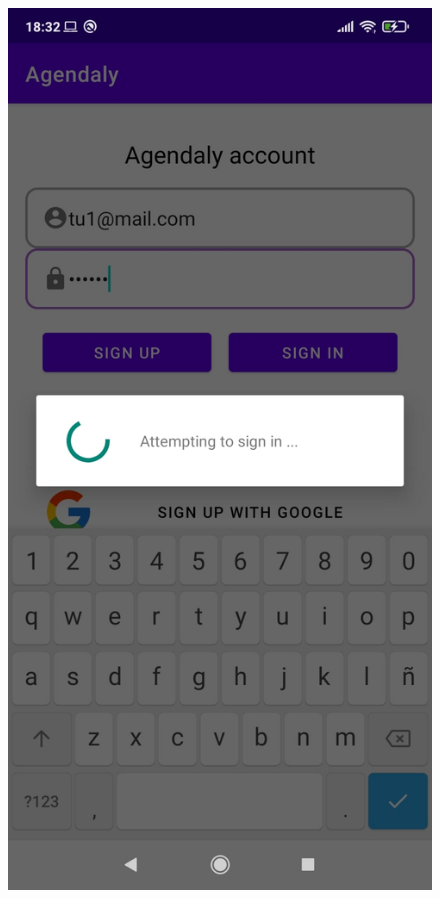 \documentclass[a4paper,openright,12pt]{article}
\begin{document}
\begin{figure}
            \includegraphics[scale=0.05]{dialog.jpeg}\hfill

\end{figure}
\end{document}

